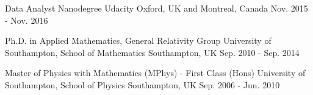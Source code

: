 

\begin{cventries}

  \cvedu
    {Data Analyst Nanodegree} %
    {Udacity} %
    {Oxford, UK and Montreal, Canada} %
    {Nov. 2015 - Nov. 2016} %

  \cvedu
    {Ph.D. in Applied Mathematics, General Relativity Group} %
    {University of Southampton, School of Mathematics} %
    {Southampton, UK} %
    {Sep. 2010 - Sep. 2014} %

  \cvedu
    {Master of Physics with Mathematics (MPhys) - First Class (Hons)} %
    {University of Southampton, School of Physics} %
    {Southampton, UK} %
    {Sep. 2006 - Jun. 2010} %


\end{cventries}
